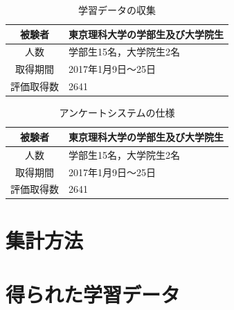 \begin{table}[ht]
  \begin{center}
  \caption{学習データの収集}
  \label{enviroment}
  \begin{tabular}{|c|l|}
    \hline
    被験者 & 東京理科大学の学部生及び大学院生 \\ \hline
    人数 & 学部生15名，大学院生2名 \\ \hline
    取得期間 & 2017年1月9日〜25日 \\ \hline
    評価取得数 & 2641 \\ \hline
  \end{tabular}
  \end{center}
\end{table}


\begin{table}[ht]
  \begin{center}
  \caption{アンケートシステムの仕様}
  \label{server}
  \begin{tabular}{|c|l|}
    \hline
    被験者 & 東京理科大学の学部生及び大学院生 \\ \hline
    人数 & 学部生15名，大学院生2名 \\ \hline
    取得期間 & 2017年1月9日〜25日 \\ \hline
    評価取得数 & 2641 \\ \hline
  \end{tabular}
  \end{center}
\end{table}

\section{集計方法}

\section{得られた学習データ}
\begin{table}[ht]
 \centering
  \caption{学習データ(物語別)}
  \vspace{0.3\baselineskip}
  \label{sentence-count}
\end{table}


